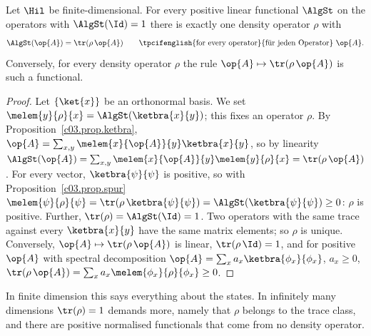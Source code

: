\begin{proposition}\label{c04.prop.funktionale}
  Let $\Hil$ be finite-dimensional. For every positive linear functional $\AlgSt$ on the operators
  with $\AlgSt(\Id) = 1$ there is exactly one density operator $\rho$ with
  \begin{equation}\label{c04.eq.funktional}
    \AlgSt(\op{A}) = \tr(\rho\, \op{A}) \qquad \text{\tpcifenglish{for every operator}{für jeden Operator}}\ \op{A} .
  \end{equation}
  Conversely, for every density operator $\rho$ the rule $\op{A} \mapsto \tr(\rho\,\op{A})$ is
  such a functional.
\end{proposition}
\begin{proof}
  Let $\{\ket{x}\}$ be an orthonormal basis. We set $\melem{y}{\rho}{x} = \AlgSt(\ketbra{x}{y})$;
  this fixes an operator $\rho$. By Proposition~\ref{c03.prop.ketbra},
  $\op{A} = \sum_{x,y} \melem{x}{\op{A}}{y} \ketbra{x}{y}$, so by linearity
  $\AlgSt(\op{A}) = \sum_{x,y} \melem{x}{\op{A}}{y}\melem{y}{\rho}{x} = \tr(\rho\,\op{A})$. For every
  vector, $\ketbra{\psi}{\psi}$ is positive, so with Proposition~\ref{c03.prop.spur}
  $\melem{\psi}{\rho}{\psi} = \tr(\rho\,\ketbra{\psi}{\psi}) = \AlgSt(\ketbra{\psi}{\psi}) \geq 0$:
  $\rho$ is positive. Further, $\tr(\rho) = \AlgSt(\Id) = 1$. Two operators with the same trace
  against every $\ketbra{x}{y}$ have the same matrix elements; so $\rho$ is unique. Conversely,
  $\op{A} \mapsto \tr(\rho\,\op{A})$ is linear, $\tr(\rho\,\Id) = 1$, and for positive $\op{A}$
  with spectral decomposition $\op{A} = \sum_x a_x \ketbra{\phi_x}{\phi_x}$, $a_x \geq 0$,
  $\tr(\rho\,\op{A}) = \sum_x a_x \melem{\phi_x}{\rho}{\phi_x} \geq 0$.
\end{proof}

In finite dimension this says everything about the states. In infinitely many dimensions
$\tr(\rho) = 1$ demands more, namely that $\rho$ belongs to the trace class, and there are
positive normalised functionals that come from no density operator.

